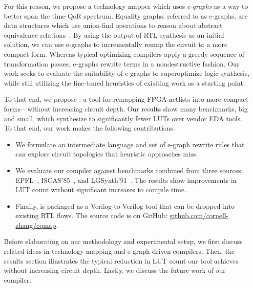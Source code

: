 For this reason, we propose a technology mapper which uses \textit{e-graphs} as
a way to better span the time-QoR spectrum. Equality graphs, referred to as
e-graphs, are data structures which use union-find operations to reason about
abstract equivalence relations~\cite{eggpaper}. By using the output of RTL
synthesis as an initial solution, we can use e-graphs to incrementally remap
the circuit to a more compact form. Whereas typical optimizing compilers apply
a greedy sequence of transformation passes, e-graphs rewrite terms in a
nondestructive fashion. Our work seeks to evaluate the suitability of e-graphs
to superoptimize logic synthesis, while still utilizing the fine-tuned
heuristics of exisiting work as a starting point.

To that end, we propose \shortname{}: a tool for remapping FPGA netlists into
more compact forms---without increasing circuit depth. Our results show many
benchmarks, big and small, which synthesize to significantly fewer LUTs over
vendor EDA tools. To that end, our work makes the following contributions:

\begin{itemize}
    \item We formulate an intermediate language and set of e-graph rewrite rules that can
          explore circuit topologies that heuristic approaches miss.
    \item We evaluate our compiler against \nbenchmarks{} benchmarks combined from three
          sources: EPFL~\cite{epflbench}, ISCAS'85~\cite{iscasbench}, and
          LGSynth'91~\cite{lgsynthbench}. The results show improvements in LUT count
          without significant increases to compile time.
    \item Finally, \shortname{} is packaged as a Verilog-to-Verilog tool that can be
          dropped into existing RTL flows. The source code is on GitHub:
          \href{https://https://github.com/cornell-zhang/eqmap}{github.com/cornell-zhang/eqmap}.
\end{itemize}

Before elaborating on our methodology and experimental setup, we first discuss
related ideas in technology mapping and e-graph driven compilers. Then, the
results section illustrates the typical reduction in LUT count our tool
achieves without increasing circuit depth. Lastly, we discuss the future work
of our compiler.